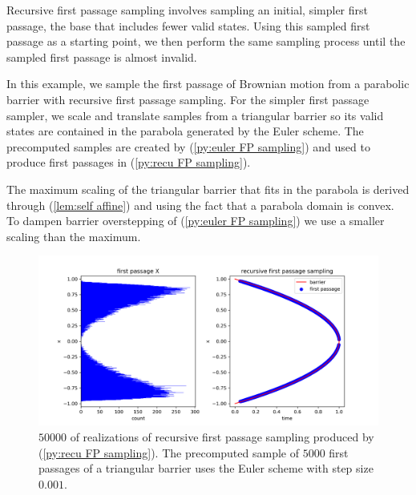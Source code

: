 \documentclass[a4paper,12pt]{article}
\begin{document}
\begin{technique}
    Recursive first passage sampling involves sampling an initial,
    simpler first passage, the base that includes fewer valid states. Using
    this sampled first passage as a starting point, we
    then perform the same sampling process until the sampled
    first passage is almost invalid.
\end{technique}


\begin{example} \label{ex:recursive first passage sampling}
    In this example, we sample the first passage of Brownian motion from a parabolic barrier
    with recursive first passage sampling.
    For the simpler first passage sampler, we scale and translate
    samples from a triangular barrier so its
    valid states are contained in the parabola generated
    by the Euler scheme. The precomputed samples are created
    by (\ref{py:euler FP sampling}) and used to produce first passages
    in (\ref{py:recu FP sampling}).

\end{example}

\begin{pythonn} \label{py:euler FP sampling}
\end{pythonn}

\begin{pythonn} \label{py:recu FP sampling}
    The maximum scaling of the triangular barrier that fits
    in the parabola is derived through (\ref{lem:self affine})
    and using the fact that a parabola domain is convex. To dampen barrier
    overstepping of (\ref{py:euler FP sampling}) we use a smaller scaling
    than the maximum. \\

    \begin{figure}[h!]
        \centering
        \includegraphics[width=1\textwidth]{plots/recursive first passage para.png}
        \caption{ $50000$ of realizations of recursive first passage sampling produced
            by (\ref{py:recu FP sampling}). The precomputed sample of $5000$ first
            passages of a triangular barrier uses the Euler scheme with
            step size $0.001$.}
        \label{fig:recursive first passage para}
    \end{figure}
\end{pythonn}
\end{document}
